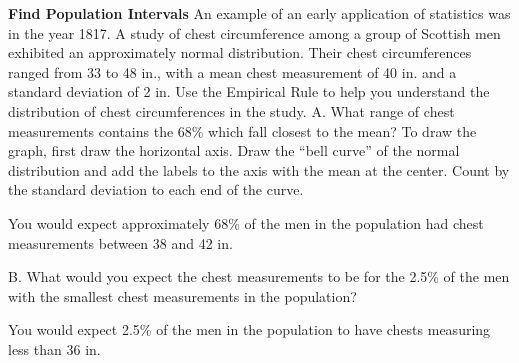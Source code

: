 \documentclass{article}
\newenvironment{example}[1]{}{}         %
\newcommand{\answer}[1]{}               %
\newcommand{\placeholder}[2]{}          %
\newcommand{\te}[1]{}                   %
\begin{document}
\begin{example}{1}
\textbf{Find Population Intervals}
An example of an early application of statistics was in the year 1817. A study of chest circumference among a group of Scottish men exhibited an approximately normal distribution. Their chest circumferences ranged from 33 to 48 in., with a mean chest measurement of 40 in. and a standard deviation of 2 in. Use the Empirical Rule to help you understand the distribution of chest circumferences in the study.
A. What range of chest measurements contains the 68\% which fall closest to the mean?
To draw the graph, first draw the horizontal axis. Draw the “bell curve” of the normal distribution and add the labels to the axis with the mean at the center. Count by the standard deviation to each end of the curve.
\placeholder{graph}{Distribution of Chest Circumferences. Red symmetric bell curve peaks at 40; horizontal labels 34,36,38,40,42,44,46 with vertical guides every 2. Blue area between 38 and 42, pale green between 36–38 and 42–44, pink tails. 38 and 42 circled green; sigma=2 below 40. No vertical scale or arrows.}
\te{Callout: The curve peaks at the mean.}
\te{Callout: The Empirical Rule is sometimes called the 68-95-99.7 Rule.}
\te{Callout: Each vertical bar represents 1 standard deviation.}
\te{Callout: Here, the mean (\mu=40) and the standard deviation (\sigma=2).}
\te{LOOK FOR RELATIONSHIPS One standard deviation from the mean is where the curve changes from opening upward to downward (left of mean), and from opening downward to upward (right of mean).}
You would expect approximately 68\% of the men in the population had chest measurements between 38 and 42 in.
\answer{A. between 38 and 42 in.}
B. What would you expect the chest measurements to be for the 2.5\% of the men with the smallest chest measurements in the population?
\placeholder{graph}{Distribution of Chest Circumferences. Red normal curve centered at 40; horizontal labels 34,36,38,40,42,44,46, vertical guides every 2. Blue area between 36 and 44; pink tails. 36 and 44 circled purple. No vertical scale or arrows.}
\te{Callout: The question asks for the smallest 2.5\% of measurements. The symmetry of the curve means that the largest 2.5\% of measurements will be equally far from the mean.}
\te{Callout: After subtracting 5\%, 95\% remains. The Empirical Rule says that 95\% of all values in a normal distribution fall within 2 standard deviations of the mean.}
\te{STUDY TIP You won't know the upper and lower boundary values for a whole population in a study just by knowing (\mu) and (\sigma). The Empirical Rule only covers 99.7\% of the values, not the farthest 0.3\% from the mean.}
You would expect 2.5\% of the men in the population to have chests measuring less than 36 in.
\answer{B. less than 36 in.}
\end{example}
\end{document}

